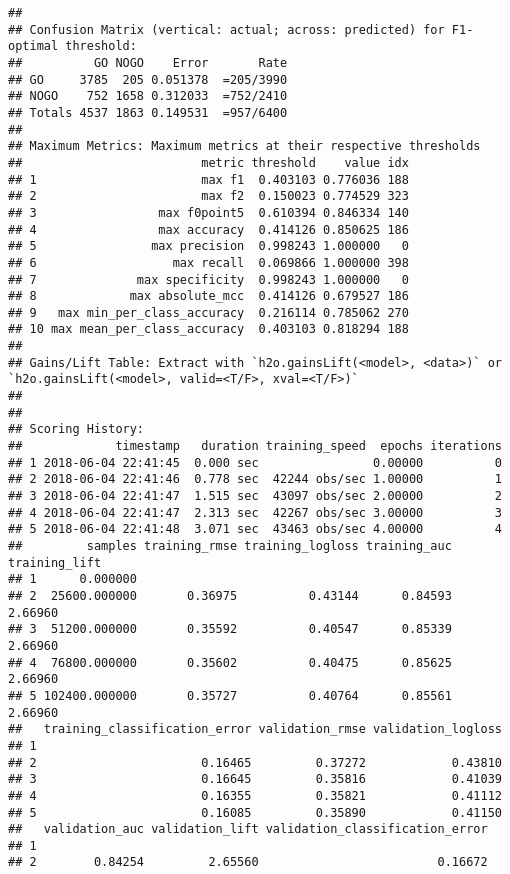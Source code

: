 \documentclass[]{article}
\begin{document}
\begin{verbatim}
## 
## Confusion Matrix (vertical: actual; across: predicted) for F1-optimal threshold:
##          GO NOGO    Error       Rate
## GO     3785  205 0.051378  =205/3990
## NOGO    752 1658 0.312033  =752/2410
## Totals 4537 1863 0.149531  =957/6400
## 
## Maximum Metrics: Maximum metrics at their respective thresholds
##                         metric threshold    value idx
## 1                       max f1  0.403103 0.776036 188
## 2                       max f2  0.150023 0.774529 323
## 3                 max f0point5  0.610394 0.846334 140
## 4                 max accuracy  0.414126 0.850625 186
## 5                max precision  0.998243 1.000000   0
## 6                   max recall  0.069866 1.000000 398
## 7              max specificity  0.998243 1.000000   0
## 8             max absolute_mcc  0.414126 0.679527 186
## 9   max min_per_class_accuracy  0.216114 0.785062 270
## 10 max mean_per_class_accuracy  0.403103 0.818294 188
## 
## Gains/Lift Table: Extract with `h2o.gainsLift(<model>, <data>)` or `h2o.gainsLift(<model>, valid=<T/F>, xval=<T/F>)`
## 
## 
## Scoring History: 
##             timestamp   duration training_speed  epochs iterations
## 1 2018-06-04 22:41:45  0.000 sec                0.00000          0
## 2 2018-06-04 22:41:46  0.778 sec  42244 obs/sec 1.00000          1
## 3 2018-06-04 22:41:47  1.515 sec  43097 obs/sec 2.00000          2
## 4 2018-06-04 22:41:47  2.313 sec  42267 obs/sec 3.00000          3
## 5 2018-06-04 22:41:48  3.071 sec  43463 obs/sec 4.00000          4
##         samples training_rmse training_logloss training_auc training_lift
## 1      0.000000                                                          
## 2  25600.000000       0.36975          0.43144      0.84593       2.66960
## 3  51200.000000       0.35592          0.40547      0.85339       2.66960
## 4  76800.000000       0.35602          0.40475      0.85625       2.66960
## 5 102400.000000       0.35727          0.40764      0.85561       2.66960
##   training_classification_error validation_rmse validation_logloss
## 1                                                                 
## 2                       0.16465         0.37272            0.43810
## 3                       0.16645         0.35816            0.41039
## 4                       0.16355         0.35821            0.41112
## 5                       0.16085         0.35890            0.41150
##   validation_auc validation_lift validation_classification_error
## 1                                                               
## 2        0.84254         2.65560                         0.16672

\end{verbatim}
\end{document}
